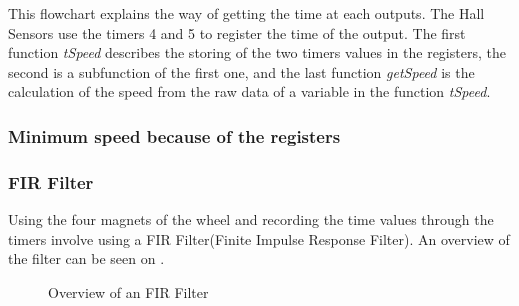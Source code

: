 This flowchart explains the way of getting the time at each outputs. The Hall Sensors use the timers 4 and 5 to register the time of the output. The first function \textit{tSpeed} describes the storing of the two timers values in the registers, the second is a subfunction of the first one, and the last function \textit{getSpeed} is the calculation of the speed from the raw data of a variable in the function \textit{tSpeed}.\\


\subsubsection{Minimum speed because of the registers}



\subsubsection{FIR Filter}

Using the four magnets of the wheel and recording the time values through the timers involve using a  FIR Filter(Finite Impulse Response Filter). An overview of the filter can be seen on .


\begin{figure}[H]
	\centering
	\caption{Overview of an FIR Filter}
	\label{FIRFilter}
\end{figure}